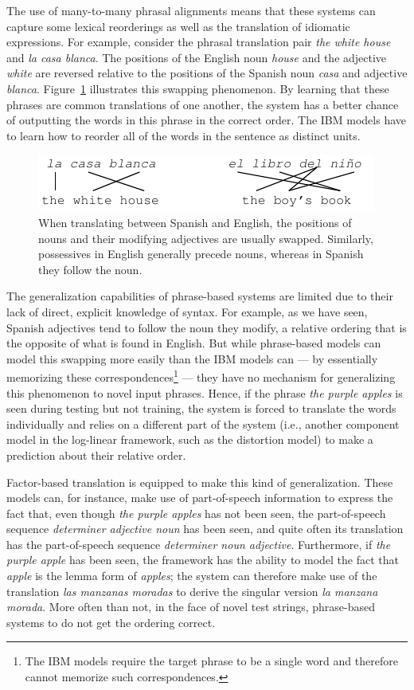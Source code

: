 \documentclass[10pt]{report}
\theoremstyle{plain}
\begin{document}
{The use of many-to-many phrasal alignments means that these systems
can capture some lexical reorderings as well as the translation of
idiomatic expressions.  For example, consider the phrasal translation
pair {\em the white house} and {\em la casa blanca}. The
positions of the English noun {\em house} and the adjective {\em
white} are reversed relative to the positions of the Spanish noun {\em
casa} and adjective {\em blanca}. Figure~\ref{localreorder}
illustrates this swapping phenomenon. By learning that these phrases
are common translations of one another, the system has a better chance
of outputting the words in this phrase in the correct order. The IBM
models have to learn how to reorder all of the words in the sentence
as distinct units.

\begin{figure}
\centering
\includegraphics[scale=1]{brooke-localreorder}
\caption{When translating between Spanish and English, the positions
of nouns and their modifying adjectives are usually
swapped. Similarly, possessives in English generally precede nouns,
whereas in Spanish they follow the noun.}
\label{localreorder}
\end{figure}

The generalization capabilities of phrase-based systems are limited
due to their lack of direct, explicit knowledge of syntax. For
example, as we have seen, Spanish adjectives tend to follow the noun
they modify, a relative ordering that is the opposite of what is found
in English. But while phrase-based models can model this swapping more
easily than the IBM models can --- by essentially memorizing these
correspondences\footnote{The IBM models require the target phrase to
be a single word and therefore cannot memorize such correspondences.}
--- they have no mechanism for generalizing this phenomenon to novel
input phrases. Hence, if the phrase {\em the purple apples} is seen
during testing but not training, the system is forced to translate the
words individually and relies on a different part of the system (i.e.,
another component model in the log-linear framework, such as the
distortion model) to make a prediction about their relative order.

Factor-based translation is equipped to make this kind of
generalization. These models can, for instance, make use of
part-of-speech information to express the fact that, even though {\em
the purple apples} has not been seen, the part-of-speech sequence {\em
determiner adjective noun} has been seen, and quite often its
translation has the part-of-speech sequence {\em determiner noun
adjective}. Furthermore, if {\em the purple apple} has been seen, the
framework has the ability to model the fact that {\em apple} is the
lemma form of {\em apples}; the system can therefore make use of the
translation {\em las manzanas moradas} to derive the singular version
{\em la manzana morada}. More often than not, in the face of novel
test strings, phrase-based systems to do not get the ordering
correct.

}
\end{document}
